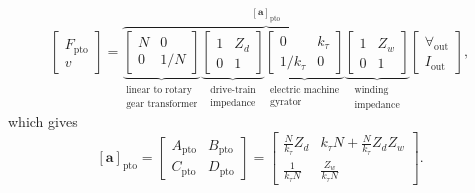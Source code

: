 \documentclass[lettersize,journal]{IEEEtran}
\begin{document}
\begin{equation}
 	\label{eq:Z_cascade_to_ABCD}
 	\begin{bmatrix} 
 		F_{\textrm{pto}} \\
 		v 
 	\end{bmatrix} 
 	\! = \!
        \overbrace{
 	\underbrace{
        \begin{bmatrix} 
                N & 0 \\ 
                0 & 1/N 
        \end{bmatrix}
        }_{\substack{\text{linear to rotary} \\ \text{gear transformer}}}
        \underbrace{
  	\begin{bmatrix} 
	 	1 & Z_d \\ 
 		0 & 1 
	\end{bmatrix}
        }_{\substack{\text{drive-train} \\ \text{impedance}}}
        \underbrace{
   	\begin{bmatrix} 
	 	0 & k_{\tau} \\ 
	 	1/k_{\tau} & 0 
        \end{bmatrix}
        }_{\substack{\text{electric machine} \\ \text{gyrator}}}
        \underbrace{
   	\begin{bmatrix} 
	 	1 & Z_w \\ 
	 	0 & 1 
	\end{bmatrix}
        }_{\substack{\text{winding} \\ \text{impedance}}}
        }^{\left[ \mathbf{a} \right]_{\textrm{pto}}}
 	\begin{bmatrix} 
 		\forall_{\textrm{out}} \\
 		I_{\textrm{out}} 
 	\end{bmatrix} \!, 
\end{equation}
%
which gives
%
\begin{equation}
        \left[ \mathbf{a} \right]_{\textrm{pto}}
	= 
	\begin{bmatrix} 
		A_{\textrm{pto}} & B_{\textrm{pto}} \\ 
		C_{\textrm{pto}} & D_{\textrm{pto}} 
	\end{bmatrix}
	=
	\begin{bmatrix} 
		\frac{N}{k_{\tau}}  Z_d & k_\tau N +\frac{N}{k_{\tau}}  Z_dZ_w  \\
		\frac{1}{k_{\tau}N}     & \frac{Z_w}{k_{\tau}N} 
	\end{bmatrix}.
	\label{eq:pto_abcd}
\end{equation}
\end{document}
